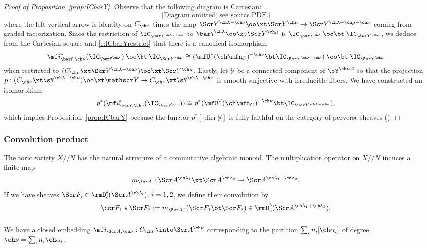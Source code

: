 \begin{proof}[Proof of Proposition~\ref{prop:ICbarY}]
Observe that the following diagram is Cartesian:
\[
\text{[Diagram omitted; see source PDF.]}
\]
where the left vertical arrow is identity on $C_{\ch\nu}$ times
the map $\Scr Y^{\ch\lambda-\ch\nu} \oo\xt \Scr Y^{\ch\mu} \to \Scr Y^{\ch\lambda+\ch\mu-\ch\nu}$  coming from graded factorization.
Since the restriction of $\IC_{\barY^{\ch\lambda+\ch\mu}}$ to
$\barY^{\ch\lambda} \oo\xt \Scr Y^{\ch\mu}$ is
$\IC_{\barY^{\ch\lambda}} \mathbin{\oo\bt} \IC_{\Scr Y^{\ch\mu}}$,
we deduce from the Cartesian square and \eqref{e:ICbarYrestrict}
that there is a canonical isomorphism
\[ \mf i^*_{\barY,\ch\nu}(\IC_{\barY^{\ch\lambda}}) \mathbin{\oo\bt} \IC_{\Scr Y^{\ch\mu}}
\cong (\mfU^\vee(\ch\mfn_C)^{-\ch\nu} \bt \IC_{\Scr Y^{\ch\lambda-\ch\nu}})
\mathbin{\oo\bt} \IC_{\Scr Y^{\ch\mu}}
\]
when restricted to $(C_{\ch\nu} \xt \Scr Y^{\ch\lambda-\ch\nu})\oo\xt \Scr Y^{\ch\mu}$.
Lastly, let $\mathscr Y$ be a connected component of $\sY^{\ch\mu,0}$ so
that the projection $p : (C_{\ch\nu} \xt \sY^{\ch\lambda-\ch\nu}) \oo\xt \mathscr Y \to
C_{\ch\nu} \xt \sY^{\ch\lambda-\ch\nu}$
is smooth surjective with irreducible fibers.
We have constructed an isomorphism
\[ p^*( \mf i^*_{\barY,\ch\nu}(\IC_{\barY^{\ch\lambda}}) )
\cong p^*(  \mfU^\vee(\ch\mfn_C)^{-\ch\nu} \bt \IC_{\Scr Y^{\ch\lambda-\ch\nu}} ), \]
which implies Proposition~\ref{prop:ICbarY} because
the functor $p^*[\dim \mathscr Y]$ is fully faithful on the category
of perverse sheaves (\cite[Proposition 4.2.5]{BBDG}).
\end{proof}


\subsubsection{Convolution product}  \label{sect:convolution-product}

The toric variety $X/\!\!/N$ has the natural structure of a commutative
algebraic monoid. The multiplication operator on $X/\!\!/N$ induces
a finite map
\[ m_{\Scr A} : \Scr A^{\ch\lambda_1} \xt \Scr A^{\ch\lambda_2} \to \Scr A^{\ch\lambda_1+\ch\lambda_2}. \]
If we have sheaves $\Scr F_i \in \rmD^b_c(\Scr A^{\ch\lambda_i}),\, i=1,2$,
we define their convolution by
\[ \Scr F_1 \star \Scr F_2 := m_{\Scr A,!}(\Scr F_1 \bt \Scr F_2) \in
\rmD^b_c(\Scr A^{\ch\lambda_1+\ch\lambda_2}). \]



\subsubsection{}
We have a closed embedding $\mf i_{\Scr A,\ch\nu} : C_{\ch\nu} \into \Scr A^{\ch\nu}$ corresponding to the partition $\sum_i n_i [\ch\alpha_i]$
of degree $\ch\nu = \sum_i n_i\ch\alpha_i$.


